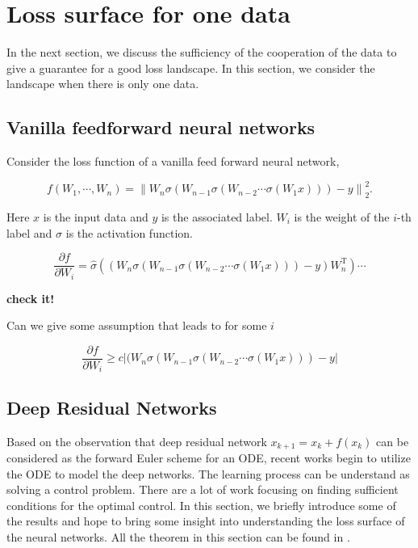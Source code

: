 \documentclass{article}
\theoremstyle{plain}
\theoremstyle{definition}
\begin{document}
\section{Loss surface for one data}

In the next section, we discuss the sufficiency of the cooperation of the data to give a guarantee for a good loss landscape. In this section, we consider the landscape when there is only one data.


\subsection{Vanilla feedforward neural networks}
Consider the loss function of a vanilla feed forward neural network,

$$f(W_1,\cdots,W_n)=\left\|W_n\sigma (W_{n-1}\sigma(W_{n-2}\cdots\sigma(W_1x)))-y\right\|_2^2.$$

Here $x$ is the input data and $y$ is the associated label. $W_i$ is the weight of the $i$-th label and $\sigma$ is the activation function.


$$
\frac{\partial f}{\partial W_i}=\hat\sigma((W_n\sigma (W_{n-1}\sigma(W_{n-2}\cdots\sigma(W_1x)))-y)W_n^\mathrm{T})\cdots
$$

\textbf{check it!}

Can we give some assumption that leads to for some $i$

$$
\frac{\partial f}{\partial W_i} \ge c|(W_n\sigma (W_{n-1}\sigma(W_{n-2}\cdots\sigma(W_1x)))-y|
$$

\subsection{Deep Residual Networks}

Based on the observation that deep residual network $x_{k+1}=x_{k}+f(x_k)$ can be considered as the forward Euler scheme for an ODE, recent works begin to utilize the ODE to model the deep networks. The learning process can be understand as solving a control problem. There are a lot of work focusing on finding sufficient conditions for the optimal control. In this section, we briefly introduce some of the results and hope to bring some insight into understanding the loss surface of the neural networks. All the theorem in this section can be found in \cite{bressan2007introduction}.
\end{document}
